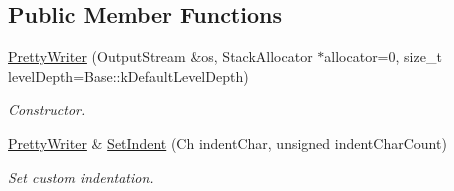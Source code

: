 \subsection*{Public Member Functions}
\begin{DoxyCompactItemize}
\item 
\hyperlink{class_pretty_writer_a83f9be5c5d595a08636962e4ddd27b60}{Pretty\+Writer} (Output\+Stream \&os, Stack\+Allocator $\ast$allocator=0, size\+\_\+t level\+Depth=Base\+::k\+Default\+Level\+Depth)
\begin{DoxyCompactList}\small\item\em Constructor. \end{DoxyCompactList}\item 
\hyperlink{class_pretty_writer}{Pretty\+Writer} \& \hyperlink{class_pretty_writer_afe3a560009b5cd6a79a1e91c807387ad}{Set\+Indent} (Ch indent\+Char, unsigned indent\+Char\+Count)
\begin{DoxyCompactList}\small\item\em Set custom indentation. \end{DoxyCompactList}\end{DoxyCompactItemize}
